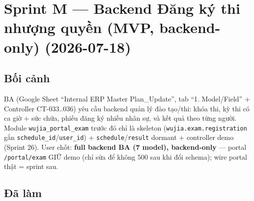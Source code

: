 \chapter{Sprint M --- Backend Đăng ký thi nhượng quyền (MVP, backend-only) (2026-07-18)}

\section{Bối cảnh}

BA (Google Sheet ``Internal ERP Master Plan\_Update'', tab ``1. Model/Field'' + Controller
CT-033..036) yêu cầu backend quản lý đào tạo/thi: khóa thi, kỳ thi có ca giờ + sức chứa, phiếu đăng ký
nhiều nhân sự, và kết quả theo từng người. Module \texttt{wujia\_portal\_exam} trước đó chỉ là skeleton
(\texttt{wujia.exam.registration} gắn \texttt{schedule\_id}/\texttt{user\_id}) + \texttt{schedule}/\texttt{result}
dormant + controller demo (Sprint 26). User chốt: \textbf{full backend BA (7 model), backend-only} ---
portal \texttt{/portal/exam} GIỮ demo (chỉ sửa để không 500 sau khi đổi schema); wire portal thật = sprint sau.

\section{Đã làm}

